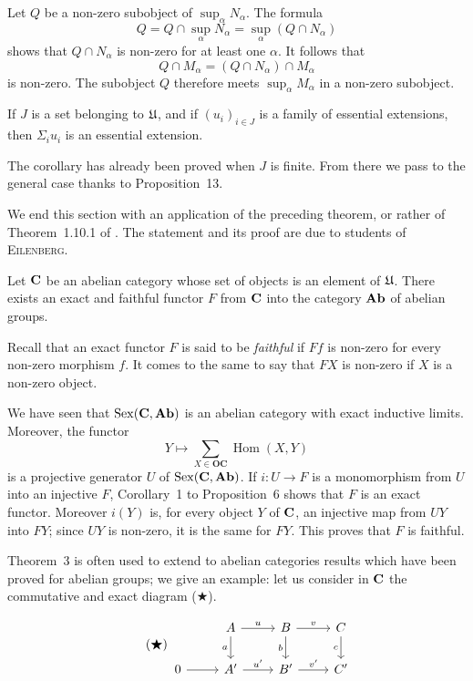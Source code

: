 Let $Q$ be a non-zero subobject of $\sup_\alpha N_\alpha$. The formula
\[
  Q = Q \cap \sup_\alpha N_\alpha = \sup_\alpha\left(Q \cap N_\alpha\right)
\]
shows that $Q \cap N_\alpha$ is non-zero for at least one $\alpha$. It follows
that
\[
  Q \cap M_\alpha = \left(Q \cap N_\alpha\right) \cap M_\alpha
\]
is non-zero. The subobject $Q$ therefore meets $\sup_\alpha M_\alpha$ in a
non-zero subobject.

\begin{unnumberedcorollary}
If $J$ is a set belonging to $\mathfrak{U}$, and if $(u_i)_{i \in J}$ is a family of
essential extensions, then $\Sigma_i u_i$ is an essential extension.
\end{unnumberedcorollary}

The corollary has already been proved when $J$ is finite. From there we pass
to the general case thanks to Proposition~13.

We end this section with an application of the preceding theorem, or rather of
Theorem~1.10.1 of \cite{grothendieck-1}. The statement and its proof are due to students of
\textsc{Eilenberg}.

\begin{theorem}
Let $\mathbf{C}$ be an abelian category whose set of objects is an element of
$\mathfrak{U}$. There exists an exact and faithful functor $F$ from $\mathbf{C}$ into the
category $\mathbf{Ab}$ of abelian groups.
\end{theorem}

Recall that an exact functor $F$ is said to be \emph{faithful} if $Ff$ is
non-zero for every non-zero morphism $f$. It comes to the same to say that $FX$
is non-zero if $X$ is a non-zero object.

We have seen that $\operatorname{Sex}(\mathbf{C}, \mathbf{Ab})$ is an abelian category with
exact inductive limits. Moreover, the functor
\[
  Y \mapsto \sum_{X \in \mathbf{OC}} \operatorname{Hom}(X, Y)
\]
is a projective generator $U$ of $\operatorname{Sex}(\mathbf{C}, \mathbf{Ab})$. If
$i\colon U \to F$ is a monomorphism from $U$ into an injective $F$,
Corollary~1 to Proposition~6 shows that $F$ is an exact functor. Moreover
$i(Y)$ is, for every object $Y$ of $\mathbf{C}$, an injective map from $UY$ into
$FY$; since $UY$ is non-zero, it is the same for $FY$. This proves that $F$ is
faithful.

Theorem~3 is often used to extend to abelian categories results which have
been proved for abelian groups; we give an example: let us consider in $\mathbf{C}$
the commutative and exact diagram ($\bigstar$).

\[
\tag{$\bigstar$}
\begin{tikzcd}
\phantom{A}
  & A \arrow[r, "u"] \arrow[d, "a"']
  & B \arrow[r, "v"] \arrow[d, "b"']
  & C \arrow[d, "c"'] \\
0 \arrow[r]
  & A' \arrow[r, "u'"]
  & B' \arrow[r, "v'"]
  & C'
\end{tikzcd}
\]

